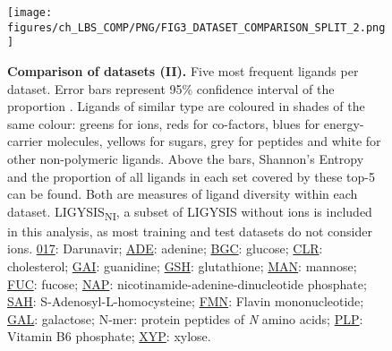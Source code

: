 \begin{figure}[ht!]
    \centering
    \texttt{[image: figures/ch\_LBS\_COMP/PNG/FIG3\_DATASET\_COMPARISON\_SPLIT\_2.png]}
    \caption[Comparison of datasets (II)]{\textbf{Comparison of datasets (II).} Five most frequent ligands per dataset. Error bars represent 95\% confidence interval of the proportion \cite{WILSON_197_PROP_CI}. Ligands of similar type are coloured in shades of the same colour: greens for ions, reds for co-factors, blues for energy-carrier molecules, yellows for sugars, grey for peptides and white for other non-polymeric ligands. Above the bars, Shannon's Entropy and the proportion of all ligands in each set covered by these top-5 can be found. Both are measures of ligand diversity within each dataset. LIGYSIS\textsubscript{NI}, a subset of LIGYSIS without ions is included in this analysis, as most training and test datasets do not consider ions. \href{https://www.ebi.ac.uk/pdbe-srv/pdbechem/chemicalCompound/show/017}{017}: Darunavir; \href{https://www.ebi.ac.uk/pdbe-srv/pdbechem/chemicalCompound/show/ADE}{ADE}: adenine; \href{https://www.ebi.ac.uk/pdbe-srv/pdbechem/chemicalCompound/show/BGC}{BGC}: glucose; \href{https://www.ebi.ac.uk/pdbe-srv/pdbechem/chemicalCompound/show/CLR}{CLR}: cholesterol; \href{https://www.ebi.ac.uk/pdbe-srv/pdbechem/chemicalCompound/show/GAI}{GAI}: guanidine; \href{https://www.ebi.ac.uk/pdbe-srv/pdbechem/chemicalCompound/show/GSH}{GSH}: glutathione; \href{https://www.ebi.ac.uk/pdbe-srv/pdbechem/chemicalCompound/show/MAN}{MAN}: mannose; \href{https://www.ebi.ac.uk/pdbe-srv/pdbechem/chemicalCompound/show/FUC}{FUC}: fucose; \href{https://www.ebi.ac.uk/pdbe-srv/pdbechem/chemicalCompound/show/NAP}{NAP}: nicotinamide-adenine-dinucleotide phosphate; \href{https://www.ebi.ac.uk/pdbe-srv/pdbechem/chemicalCompound/show/SAH}{SAH}: S-Adenosyl-L-homocysteine; \href{https://www.ebi.ac.uk/pdbe-srv/pdbechem/chemicalCompound/show/FMN}{FMN}: Flavin mononucleotide; \href{https://www.ebi.ac.uk/pdbe-srv/pdbechem/chemicalCompound/show/GAL}{GAL}: galactose; N-mer: protein peptides of \textit{N} amino acids; \href{https://www.ebi.ac.uk/pdbe-srv/pdbechem/chemicalCompound/show/PLP}{PLP}: Vitamin B6 phosphate; \href{https://www.ebi.ac.uk/pdbe-srv/pdbechem/chemicalCompound/show/XYP}{XYP}: xylose.}
    \label{fig:dataset_comp_2}
\end{figure}

